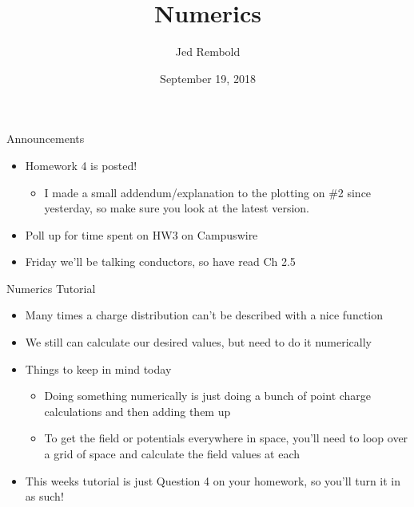 \documentclass[pdf,aspectratio=169]{beamer}
\title{Numerics}
\date{September 19, 2018}
\author{Jed Rembold}
\begin{document}
\renewcommand{\theenumi}{\Alph{enumi}}

\begin{frame}{Announcements}
	\begin{itemize}
		\item Homework 4 is posted!
			\begin{itemize}
				\item I made a small addendum/explanation to the plotting on \#2 since yesterday, so make sure you look at the latest version.
			\end{itemize}
		\item Poll up for time spent on HW3 on Campuswire
		\item Friday we'll be talking conductors, so have read Ch 2.5
	\end{itemize}
\end{frame}

\begin{frame}{Numerics Tutorial}
	\begin{itemize}
		\item Many times a charge distribution can't be described with a nice function
		\item We still can calculate our desired values, but need to do it numerically
		\item Things to keep in mind today
			\begin{itemize}
				\item Doing something numerically is just doing a bunch of point charge calculations and then adding them up
				\item To get the field or potentials everywhere in space, you'll need to loop over a grid of space and calculate the field values at each
			\end{itemize}
		\item This weeks tutorial is just Question 4 on your homework, so you'll turn it in as such!
	\end{itemize}
\end{frame}
\end{document}
